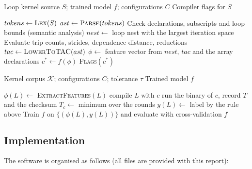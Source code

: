 \documentclass[12pt,a4paper]{article}
\begin{document}
\begin{algorithm}[H]
\caption{ML-Based Loop Optimisation Decision}
\label{alg:compiler}
\begin{algorithmic}[1]

\Require Loop kernel source $S$; trained model $f$; configurations $C$
\Ensure Compiler flags for $S$

\State $tokens \gets \textsc{Lex}(S)$
\State $ast \gets \textsc{Parse}(tokens)$
\State Check declarations, subscripts and loop bounds (semantic analysis)
\State $nest \gets$ loop nest with the largest iteration space
\State Evaluate trip counts, strides, dependence distance, reductions
\State $tac \gets \textsc{LowerToTAC}(ast)$
\State $\phi \gets$ feature vector from $nest$, $tac$ and the array declarations
\State $c^{*} \gets f(\phi)$
\State \Return \textsc{Flags}$(c^{*})$

\end{algorithmic}
\end{algorithm}

\begin{algorithm}[H]
\caption{Construction of the Training Set and Model}
\label{alg:training}
\begin{algorithmic}[1]

\Require Kernel corpus $\mathcal{K}$; configurations $C$; tolerance $\tau$
\Ensure Trained model $f$

    \State $\phi(L) \gets$ \textsc{ExtractFeatures}$(L)$
        \State compile $L$ with $c$
    \EndFor
            \State run the binary of $c$, record $T$ and the checksum
        \EndFor
    \EndFor
    \State $T_c \gets$ minimum over the rounds
    \State $y(L) \gets$ label by the rule above
\EndFor
\State Train $f$ on $\{(\phi(L),y(L))\}$ and evaluate with cross-validation
\State \Return $f$

\end{algorithmic}
\end{algorithm}

\subsection{Implementation}

The software is organised as follows (all files are provided with this report):
\end{document}

